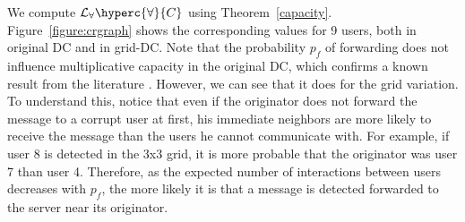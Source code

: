 We compute $\mathcal{L}_\forall\hyperc{\forall}{C}$ using Theorem~\ref{capacity}. 
Figure~\ref{figure:crgraph} shows the corresponding values for 9 users, both in 
original DC and in grid-DC.
Note that the probability $p_f$ of forwarding does not influence multiplicative 
capacity in the original DC, which confirms a known result from the literature 
\cite{minresource}.
However, we can see that it does for the grid variation. 
To understand this, notice that even if the originator does not forward 
the message to a corrupt user at first, his immediate neighbors are more 
likely to receive the message than the users he cannot communicate with. 
For example, if user 8 is detected in the 3x3 grid, it is more probable 
that the originator was user 7 than user 4.
Therefore, as the expected number of interactions between users decreases 
with $p_f$, the more likely it is that a message is detected  forwarded 
to the server near its originator.


